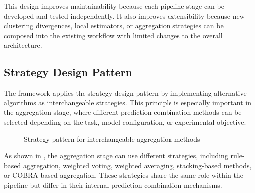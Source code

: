 This design improves maintainability because each pipeline stage can be developed and tested independently. It also improves extensibility because new clustering divergences, local estimators, or aggregation strategies can be composed into the existing workflow with limited changes to the overall architecture.


\subsection{Strategy Design Pattern}

\hs The framework applies the strategy design pattern by implementing alternative algorithms as interchangeable strategies. This principle is especially important in the aggregation stage, where different prediction combination methods can be selected depending on the task, model configuration, or experimental objective.

\begin{figure}[H]
      \centering
      \caption{Strategy pattern for interchangeable aggregation methods}
      \label{fig:strategy-design-pattern}
\end{figure}

As shown in , the aggregation stage can use different strategies, including rule-based aggregation, weighted voting, weighted averaging, stacking-based methods, or COBRA-based aggregation. These strategies share the same role within the pipeline but differ in their internal prediction-combination mechanisms.

